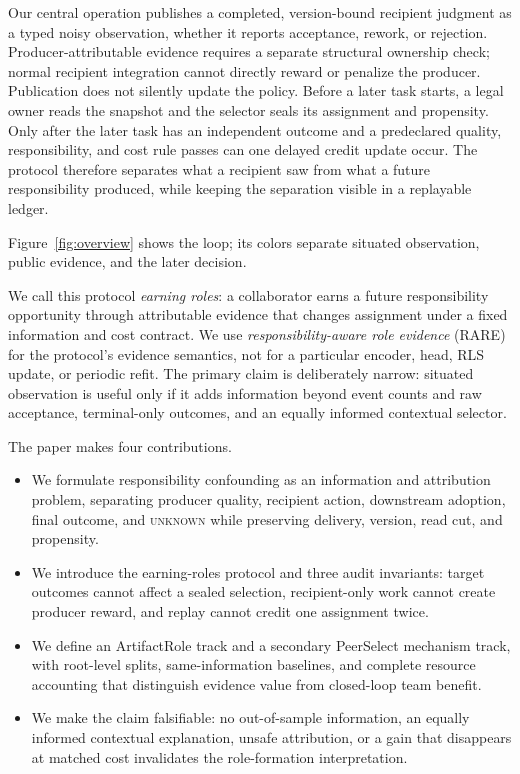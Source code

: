 \documentclass[sigconf,anonymous]{aamas}
\newcommand{\unknown}{\textsc{unknown}}
\begin{document}
Our central operation publishes a completed, version-bound recipient judgment as a typed noisy observation, whether it reports acceptance, rework, or rejection. Producer-attributable evidence requires a separate structural ownership check; normal recipient integration cannot directly reward or penalize the producer. Publication does not silently update the policy. Before a later task starts, a legal owner reads the snapshot and the selector seals its assignment and propensity. Only after the later task has an independent outcome and a predeclared quality, responsibility, and cost rule passes can one delayed credit update occur. The protocol therefore separates what a recipient saw from what a future responsibility produced, while keeping the separation visible in a replayable ledger.

Figure~\ref{fig:overview} shows the loop; its colors separate situated observation, public evidence, and the later decision.

We call this protocol \emph{earning roles}: a collaborator earns a future responsibility opportunity through attributable evidence that changes assignment under a fixed information and cost contract. We use \emph{responsibility-aware role evidence} (RARE) for the protocol's evidence semantics, not for a particular encoder, head, RLS update, or periodic refit. The primary claim is deliberately narrow: situated observation is useful only if it adds information beyond event counts and raw acceptance, terminal-only outcomes, and an equally informed contextual selector.

The paper makes four contributions.
\begin{itemize}
  \item We formulate responsibility confounding as an information and attribution problem, separating producer quality, recipient action, downstream adoption, final outcome, and \unknown{} while preserving delivery, version, read cut, and propensity.
  \item We introduce the earning-roles protocol and three audit invariants: target outcomes cannot affect a sealed selection, recipient-only work cannot create producer reward, and replay cannot credit one assignment twice.
  \item We define an ArtifactRole track and a secondary PeerSelect mechanism track, with root-level splits, same-information baselines, and complete resource accounting that distinguish evidence value from closed-loop team benefit.
  \item We make the claim falsifiable: no out-of-sample information, an equally informed contextual explanation, unsafe attribution, or a gain that disappears at matched cost invalidates the role-formation interpretation.
\end{itemize}
\end{document}
